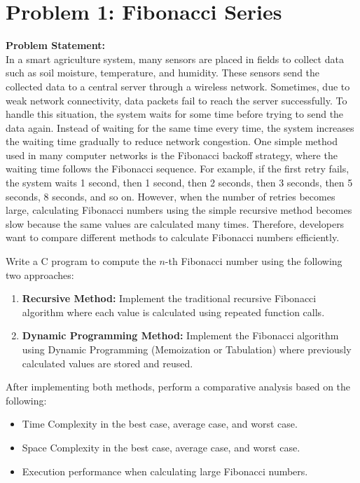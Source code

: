 \documentclass[a4paper,12pt]{article}
\begin{document}
\thispagestyle{firstpage}

\section*{Problem 1: Fibonacci Series}
\textbf{Problem Statement:}\\
In a smart agriculture system, many sensors are placed in fields to collect data such as soil moisture, temperature, and humidity. These sensors send the collected data to a central server through a wireless network. Sometimes, due to weak network connectivity, data packets fail to reach the server successfully. To handle this situation, the system waits for some time before trying to send the data again. Instead of waiting for the same time every time, the system increases the waiting time gradually to reduce network congestion. One simple method used in many computer networks is the Fibonacci backoff strategy, where the waiting time follows the Fibonacci sequence. For example, if the first retry fails, the system waits 1 second, then 1 second, then 2 seconds, then 3 seconds, then 5 seconds, 8 seconds, and so on. However, when the number of retries becomes large, calculating Fibonacci numbers using the simple recursive method becomes slow because the same values are calculated many times. Therefore, developers want to compare different methods to calculate Fibonacci numbers efficiently.

Write a C program to compute the $n$-th Fibonacci number using the following two approaches:
\begin{enumerate}
    \item \textbf{Recursive Method:} Implement the traditional recursive Fibonacci algorithm where each value is calculated using repeated function calls.
    \item \textbf{Dynamic Programming Method:} Implement the Fibonacci algorithm using Dynamic Programming (Memoization or Tabulation) where previously calculated values are stored and reused.
\end{enumerate}

After implementing both methods, perform a comparative analysis based on the following:
\begin{itemize}
    \item Time Complexity in the best case, average case, and worst case.
    \item Space Complexity in the best case, average case, and worst case.
    \item Execution performance when calculating large Fibonacci numbers.
\end{itemize}
\end{document}
